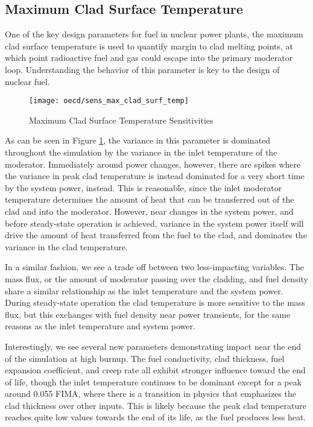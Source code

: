 \subsection{Maximum Clad Surface Temperature}
One of the key design parameters for fuel in nuclear power plants, the maximum clad surface temperature is
used to quantify margin to clad melting points, at which point radioactive fuel and gas could escape into
the primary moderator loop.  Understanding the behavior of this parameter is key to the design of nuclear
fuel.
\begin{figure}[H]
  \centering
  \texttt{[image: oecd/sens\_max\_clad\_surf\_temp]}
  \caption{Maximum Clad Surface Temperature Sensitivities}
  \label{fig:oecd clad temp}
\end{figure}
As can be seen in Figure \ref{fig:oecd clad temp}, the variance in this parameter is dominated throughout the
simulation by the variance in the inlet temperature of the moderator.  Immediately around power changes,
however, there are spikes where the variance in peak clad temperature is instead dominated for a very short
time by the system power, instead.  This is reasonable, since the inlet moderator temperature determines the
amount of heat that can be transferred out of the clad and into the moderator.  However, near changes in the
system power, and before steady-state operation is achieved, variance in the system power itself will drive
the amount of heat transferred from the fuel to the clad, and dominates the variance in the clad temperature.

In a similar fashion, we see a trade off between two less-impacting variables.  The mass flux, or the amount
of moderator passing over the cladding, and fuel density share a similar relationship as the inlet temperature
and the system power. During
steady-state operation the clad temperature is more sensitive to the mass flux, but this exchanges with fuel
density near power transients, for the same reasons as the inlet temperature and system power.

Interestingly, we see several new parameters demonstrating impact near the end of the simulation at high
burnup.  The fuel conductivity, clad thickness, fuel expansion coefficient, and creep rate all exhibit
stronger influence toward the end of life, though the inlet temperature continues to be dominant except for a
peak around 0.055 FIMA, where there is a transition in physics that emphasizes the clad thickness over other
inputs. This is likely because the peak clad temperature reaches quite low values towards the end of its life,
as the fuel produces less heat.

